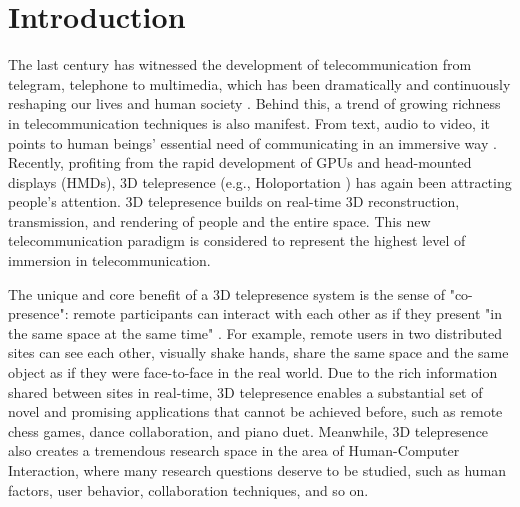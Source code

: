 
\section{Introduction}

The last century has witnessed the development of telecommunication from telegram, telephone to multimedia, which has been dramatically and continuously reshaping our lives and human society \cite{friedman2007world}. Behind this, a trend of growing richness in telecommunication techniques is also manifest. From text, audio to video, it points to human beings' essential need of communicating in an immersive way \cite{apostolopoulos2012road}. Recently, profiting from the rapid development of GPUs and head-mounted displays (HMDs), 3D telepresence (e.g., Holoportation \cite{orts2016holoportation}) has again been attracting people's attention. 3D telepresence builds on real-time 3D reconstruction, transmission, and rendering of people and the entire space. This new telecommunication paradigm is considered to represent the highest level of immersion in telecommunication.




The unique and core benefit of a 3D telepresence system is the sense of "co-presence": remote participants can interact with each other as if they present "in the same space at the same time" \cite{orts2016holoportation, kraut2003visual}. For example, remote users in two distributed sites can see each other, visually shake hands, share the same space and the same object as if they were face-to-face in the real world. Due to the rich information shared between sites in real-time, 3D telepresence enables a substantial set of novel and promising applications that cannot be achieved before, such as remote chess games, dance collaboration, and piano duet. Meanwhile, 3D telepresence also creates a tremendous research space in the area of Human-Computer Interaction, where many research questions deserve to be studied, such as human factors, user behavior, collaboration techniques, and so on.


